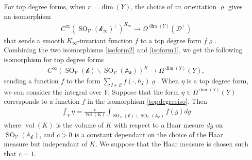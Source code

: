 \documentclass[11pt]{article} %
\newcommand{\8}{\infty}
\newcommand{\kbf}{\mathcal{k}}
\newcommand{\SO}{\operatorname{SO}}
\newcommand{\D}{\mathcal{D}}
\newcommand{\A}{\mathbb{A}}
\newcommand{\vol}{\operatorname{vol}}
\newcommand{\Vcal}{\mathcal{V}}
\newcommand{\Ccal}{\mathcal{C}}
\theoremstyle{mytheoremstyle}
\theoremstyle{remark}
\numberwithin{equation}{section}
\begin{document}
For top degree forms, when $r=\dim(Y)$, the choice of an orientation $\varrho$ gives an isomorphism
\begin{align} \label{isoform1}
    C^\8\left (\SO_\Vcal(\kbf_\8)^+ \right )^{K_\8} \longrightarrow \Omega^{\dim(Y)}(\D^+)
\end{align}
that sends a smooth $K_\8$-invariant function $f$ to a top degree form $f\varrho$. Combining the two isomorphisms \eqref{isoform2} and \eqref{isoform1}, we get the following isomorphism for top degree forms
\begin{align}\label{topdegreeiso}
 C^\8\left (\SO_\Vcal(\kbf)\backslash \SO_\Vcal(\A_\kbf) \right)^{K}   \longrightarrow \Omega^{\dim(Y)}(Y), 
\end{align}
sending a function $f$ to the form $\sum_{I \in \Ccal} f(\cdot,h_I)\varrho$. When $\eta$ is a top degree form, we can consider the integral over $Y$. Suppose that the form $\eta \in \Omega^{\dim(Y)}(Y)$ { corresponds} to a function $f$ in the isomorphism \eqref{topdegreeiso}. Then
\begin{align}
    \int_{Y}\eta = \frac{c}{\vol(K)}\int_{\SO_\Vcal(\kbf)\backslash \SO_\Vcal(\A_\kbf)}f(g)dg
\end{align}
where $\vol(K)$ is the volume of $K$ with respect to a Haar mesure $dg$ on $\SO_{\Vcal}(\A_\kbf)$, and $c>0$ is a constant dependant on the choice of the Haar measure but independant of $K$. We suppose that the Haar measure is chosen such that $c=1$.
\end{document}
